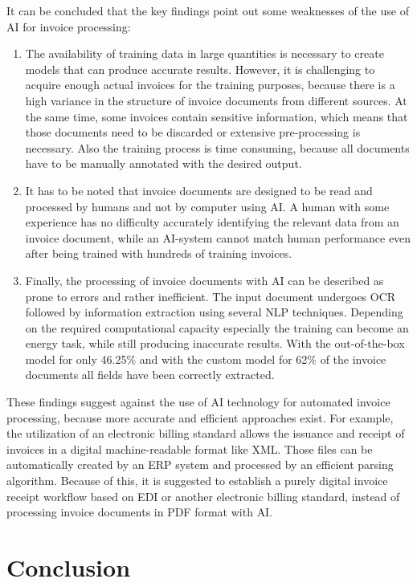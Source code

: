 It can be concluded that the key findings point out some weaknesses of the use of \acl{AI} for invoice processing:
\begin{enumerate}
    \item The availability of training data in large quantities is necessary to create models that can produce accurate results. However, it is challenging to acquire enough actual invoices for the training purposes, because there is a high variance in the structure of invoice documents from different sources. At the same time, some invoices contain sensitive information, which means that those documents need to be discarded or extensive pre-processing is necessary. Also the training process is time consuming, because all documents have to be manually annotated with the desired output.
    \item It has to be noted that invoice documents are designed to be read and processed by humans and not by computer using \ac{AI}. A human with some experience has no difficulty accurately identifying the relevant data from an invoice document, while an \ac{AI}-system cannot match human performance even after being trained with hundreds of training invoices.
    \item Finally, the processing of invoice documents with \ac{AI} can be described as prone to errors and rather inefficient. The input document undergoes \ac{OCR} followed by information extraction using several \ac{NLP} techniques. Depending on the required computational capacity especially the training can become an energy task, while still producing inaccurate results. With the out-of-the-box model for only 46.25\% and with the custom model for 62\% of the invoice documents all fields have been correctly extracted.
\end{enumerate}
These findings suggest against the use of \ac{AI} technology for automated invoice processing, because more accurate and efficient approaches exist. For example, the utilization of an electronic billing standard allows the issuance and receipt of invoices in a digital machine-readable format like XML. Those files can be automatically created by an \ac{ERP} system and processed by an efficient parsing algorithm.
Because of this, it is suggested to establish a purely digital invoice receipt workflow based on \ac{EDI} or another electronic billing standard, instead of processing invoice documents in PDF format with \ac{AI}.

\chapter{Conclusion}


